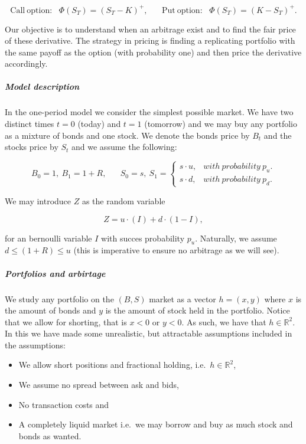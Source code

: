 \documentclass[
]{article}
\providecommand{\tightlist}{%
  \setlength{\itemsep}{0pt}\setlength{\parskip}{0pt}}
\begin{document}
\[\text{Call}\ \text{option:}\hspace{10pt}\Phi(S_T)=(S_T-K)^+,\hspace{20pt}\text{Put}\ \text{option:}\hspace{10pt}\Phi(S_T)=(K-S_T)^+.\]

Our objective is to understand when an arbitrage exist and to find the
fair price of these derivative. The strategy in pricing is finding a
replicating portfolio with the same payoff as the option (with
probability one) and then price the derivative accordingly.

\hypertarget{model-description}{%
\subparagraph{Model description}\label{model-description}}

In the one-period model we consider the simplest possible market. We
have two distinct times \(t=0\) (today) and \(t=1\) (tomorrow) and we
may buy any portfolio as a mixture of bonds and one stock. We denote the
bonds price by \(B_t\) and the stocks price by \(S_t\) and we assume the
following:

\[
B_0=1,\ B_1=1+R,\hspace{20pt}S_0=s,\ S_1=\left\{\begin{matrix}s\cdot u, & with\ probability\ p_u.\\s\cdot d, & with\ probability\ p_d.\end{matrix}\right.
\]

We may introduce \(Z\) as the random variable

\[
Z=u\cdot (I)+d\cdot (1-I),
\]

for an bernoulli variable \(I\) with succes probability \(p_u\).
Naturally, we assume \(d\le (1+R)\le u\) (this is imperative to ensure
no arbitrage as we will see).

\hypertarget{portfolios-and-arbirtage}{%
\subparagraph{Portfolios and arbirtage}\label{portfolios-and-arbirtage}}

We study any portfolio on the \((B,S)\) market as a vector \(h=(x,y)\)
where \(x\) is the amount of bonds and \(y\) is the amount of stock held
in the portfolio. Notice that we allow for shorting, that is \(x<0\) or
\(y<0\). As such, we have that \(h\in \mathbb{R}^2\). In this we have
made some unrealistic, but attractable assumptions included in the
assumptions:

\begin{itemize}
\tightlist
\item
  We allow short positions and fractional holding,
  i.e.~\(h\in \mathbb{R}^2\),
\item
  We assume no spread between ask and bids,
\item
  No transaction costs and
\item
  A completely liquid market i.e.~we may borrow and buy as much stock
  and bonds as wanted.
\end{itemize}
\end{document}
